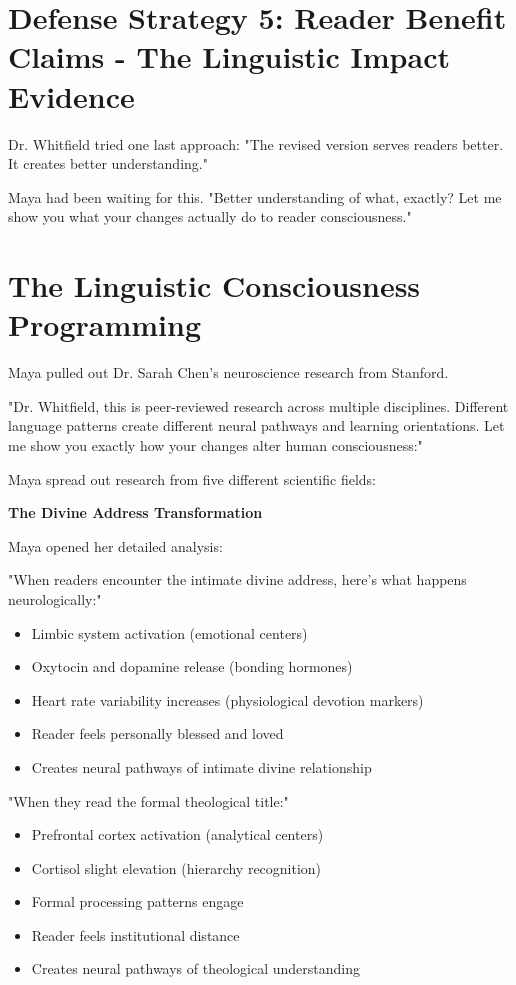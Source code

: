 \documentclass[11pt,twoside]{book}
\begin{document}
\section*{Defense Strategy 5: Reader Benefit Claims - The Linguistic Impact Evidence}
\label{sec:orgb29e96d}

Dr. Whitfield tried one last approach: "The revised version serves readers better. It creates better understanding."

Maya had been waiting for this. "Better understanding of what, exactly? Let me show you what your changes actually do to reader consciousness."
\section*{The Linguistic Consciousness Programming}
\label{sec:org8179e6b}

Maya pulled out Dr. Sarah Chen's neuroscience research from Stanford.

"Dr. Whitfield, this is peer-reviewed research across multiple disciplines. Different language patterns create different neural pathways and learning orientations. Let me show you exactly how your changes alter human consciousness:"

Maya spread out research from five different scientific fields:

\textbf{\textbf{The Divine Address Transformation}}

Maya opened her detailed analysis:

"When readers encounter the intimate divine address, here's what happens neurologically:"
\begin{itemize}
\item Limbic system activation (emotional centers)
\item Oxytocin and dopamine release (bonding hormones)
\item Heart rate variability increases (physiological devotion markers)
\item Reader feels personally blessed and loved
\item Creates neural pathways of intimate divine relationship
\end{itemize}

"When they read the formal theological title:"
\begin{itemize}
\item Prefrontal cortex activation (analytical centers)
\item Cortisol slight elevation (hierarchy recognition)
\item Formal processing patterns engage
\item Reader feels institutional distance
\item Creates neural pathways of theological understanding
\end{itemize}
\end{document}
